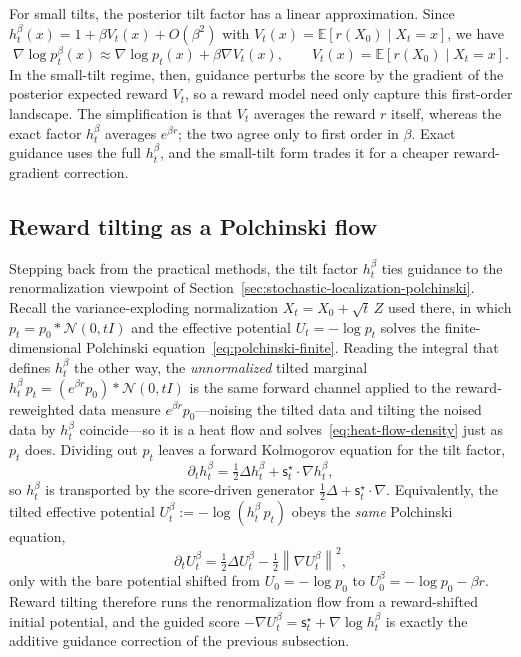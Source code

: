 \documentclass{amsart}
\numberwithin{equation}{section}
\theoremstyle{plain}
\theoremstyle{definition}
\theoremstyle{remark}
\newcommand{\E}{\mathbb{E}}
\newcommand{\Id}{I}
\newcommand{\norm}[1]{\left\lVert #1 \right\rVert}
\newcommand{\sstar}{\mathsf{s}^{\star}}
\newcommand{\normal}[2]{\mathcal{N}\!\left(#1,#2\right)}
\begin{document}
For small tilts, the posterior tilt factor has a linear approximation.  Since
$h_t^\beta(x)=1+\beta V_t(x)+O(\beta^2)$ with
$V_t(x)=\E[r(X_0)\mid X_t=x]$, we have
\begin{equation}\label{eq:value-guidance}
    \nabla\log p_t^\beta(x)
    \approx
    \nabla\log p_t(x)
    +
    \beta\nabla V_t(x),
    \qquad
    V_t(x)=\E[r(X_0)\mid X_t=x].
\end{equation}
In the small-tilt regime, then, guidance perturbs the score by the gradient of
the posterior expected reward $V_t$, so a reward model need only capture this
first-order landscape.  The simplification is that $V_t$ averages the reward $r$
itself, whereas the exact factor $h_t^\beta$ averages $e^{\beta r}$; the two
agree only to first order in $\beta$.  Exact guidance uses the full $h_t^\beta$,
and the small-tilt form trades it for a cheaper reward-gradient correction.

\subsection{Reward tilting as a Polchinski flow}
\label{subsec:polchinski-tilt}

Stepping back from the practical methods, the tilt factor $h_t^\beta$ ties
guidance to the renormalization viewpoint of
Section~\ref{sec:stochastic-localization-polchinski}.  Recall the
variance-exploding normalization $X_t=X_0+\sqrt t\,Z$ used there, in which
$p_t=p_0*\normal{0}{t\Id}$ and the effective potential $U_t=-\log p_t$ solves the
finite-dimensional Polchinski equation~\eqref{eq:polchinski-finite}.
Reading the integral that defines $h_t^\beta$ the other way, the
\emph{unnormalized} tilted marginal
$h_t^\beta\,p_t=(e^{\beta r}p_0)*\normal{0}{t\Id}$ is the same forward
channel applied to the reward-reweighted data measure $e^{\beta r}p_0$---noising
the tilted data and tilting the noised data by $h_t^\beta$ coincide---so it is a
heat flow and solves~\eqref{eq:heat-flow-density} just as $p_t$ does.  Dividing
out $p_t$ leaves a forward Kolmogorov equation for the tilt factor,
\begin{equation}\label{eq:tilt-pde}
    \partial_t h_t^\beta
    =
    \tfrac12\Delta h_t^\beta
    +
    \sstar_t\cdot\nabla h_t^\beta,
\end{equation}
so $h_t^\beta$ is transported by the score-driven generator
$\tfrac12\Delta+\sstar_t\cdot\nabla$.  Equivalently, the tilted effective
potential $U_t^\beta:=-\log(h_t^\beta\,p_t)$ obeys the \emph{same} Polchinski equation,
\begin{equation}\label{eq:polchinski-tilt}
    \partial_t U_t^\beta
    =
    \tfrac12\Delta U_t^\beta
    -
    \tfrac12\norm{\nabla U_t^\beta}^2,
\end{equation}
only with the bare potential shifted from $U_0=-\log p_0$ to $U_0^{\beta} = -\log p_0-\beta r$.
Reward tilting therefore runs the renormalization flow from a
reward-shifted initial potential, and the guided score
$-\nabla U_t^\beta=\sstar_t+\nabla\log h_t^\beta$ is exactly the additive
guidance correction of the previous subsection.
\end{document}
